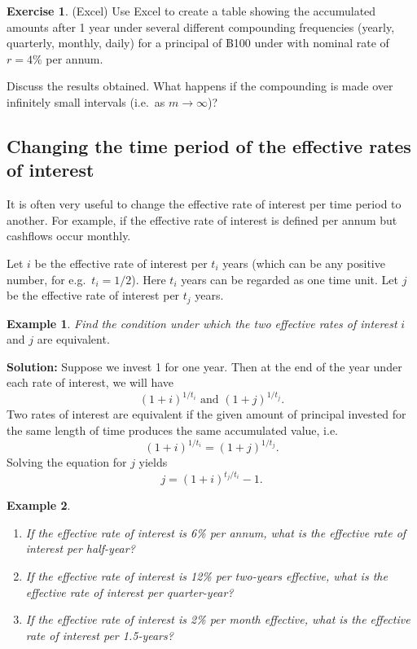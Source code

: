 \documentclass[
]{book}
\theoremstyle{definition}
\theoremstyle{definition}
\newtheorem{example}{Example}[chapter]
\theoremstyle{definition}
\newtheorem{exercise}{Exercise}[chapter]
\theoremstyle{definition}
\theoremstyle{remark}
\begin{document}
\begin{exercise}
(Excel) Use Excel to create a table showing the accumulated amounts after 1 year under several different compounding frequencies (yearly, quarterly, monthly, daily) for a principal of ฿100 under with nominal rate of \(r = 4\%\) per annum.

Discuss the results obtained. What happens if the compounding is made over infinitely small intervals (i.e.~as \(m \rightarrow \infty\))?
\end{exercise}

\subsection{Changing the time period of the effective rates of interest}\label{changing-the-time-period-of-the-effective-rates-of-interest}

It is often very useful to change the effective rate of interest per
time period to another. For example, if the effective rate of interest
is defined per annum but cashflows occur monthly.

Let \(i\) be the effective rate of interest per \(t_i\) years (which can be
any positive number, for e.g.~\(t_i = 1/2\)). Here \(t_i\) years can be
regarded as one time unit. Let \(j\) be the effective rate of interest per
\(t_j\) years.

\begin{example}
\emph{Find the condition under which the two effective rates of interest} \(i\)
and \(j\) are equivalent.
\end{example}

\textbf{Solution:} Suppose we invest 1 for one year. Then at the end of the
year under each rate of interest, we will have
\[(1+i)^{1/t_i} \text{ and } (1+j)^{1/t_j}.\] Two rates of interest are
equivalent if the given amount of principal invested for the same length
of time produces the same accumulated value, i.e.
\[(1+i)^{1/t_i} = (1+j)^{1/t_j}.\] Solving the equation for \(j\) yields
\[j = (1+i)^{t_j/t_i} - 1.\]

\begin{example}
\leavevmode

\begin{enumerate}
\def\labelenumi{\arabic{enumi}.}
\item
  \emph{If the effective rate of interest is 6\% per annum, what is the
  effective rate of interest per half-year?}
\item
  \emph{If the effective rate of interest is 12\% per two-years effective,
  what is the effective rate of interest per quarter-year?}
\item
  \emph{If the effective rate of interest is 2\% per month effective, what
  is the effective rate of interest per 1.5-years?}
\end{enumerate}

\end{example}
\end{document}
